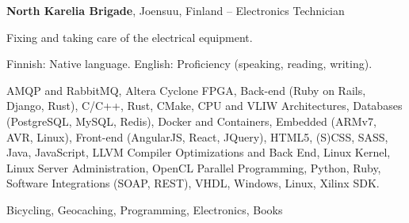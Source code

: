 \documentclass[letterpaper,MMMyyyy,nonstopmode]{simpleresumecv}
\begin{document}
\begin{Body}
\newpage

\BigGap
\Entry
\textbf{North Karelia Brigade}, Joensuu, Finland
\hfill
{} -- 
\Gap
\BulletItem Electronics Technician
\begin{Detail}
    \SubBulletItem Fixing and taking care of the electrical equipment.
\end{Detail}



\BulletItem Finnish: Native language.
\Gap
\BulletItem English: Proficiency (speaking, reading, writing).



\Entry
\BulletItem AMQP and RabbitMQ,
\BulletItem Altera Cyclone FPGA,
\BulletItem Back-end (Ruby on Rails, Django, Rust),
\BulletItem C/C++,
\BulletItem Rust,
\BulletItem CMake,
\BulletItem CPU and VLIW Architectures,
\BulletItem Databases (PostgreSQL, MySQL, Redis),
\BulletItem Docker and Containers,
\BulletItem Embedded (ARMv7, AVR, Linux),
\BulletItem Front-end (AngularJS, React, JQuery),
\BulletItem HTML5, (S)CSS, SASS,
\BulletItem Java,
\BulletItem JavaScript,
\BulletItem LLVM Compiler Optimizations and Back End,
\BulletItem Linux Kernel,
\BulletItem Linux Server Administration,
\BulletItem OpenCL Parallel Programming,
\BulletItem Python,
\BulletItem Ruby,
\BulletItem Software Integrations (SOAP, REST),
\BulletItem VHDL,
\BulletItem Windows, Linux,
\BulletItem Xilinx SDK.



\Entry
Bicycling, Geocaching, Programming, Electronics, Books

\end{Body}
\end{document}
